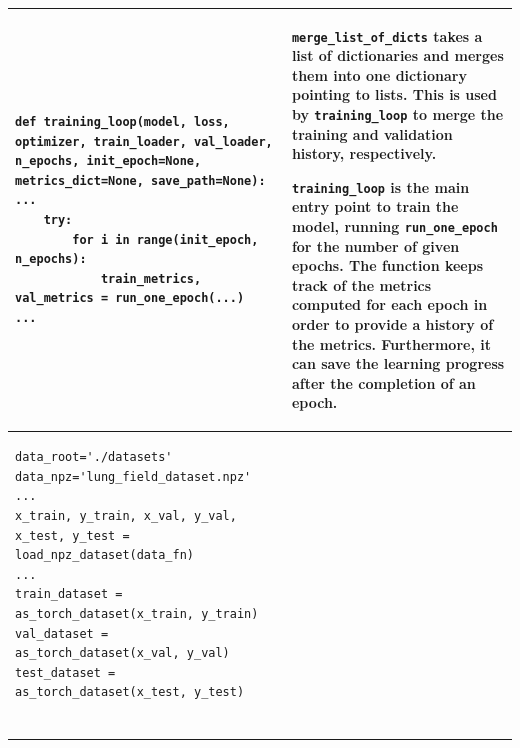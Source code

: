 \begin{longtable}{|m{}|m{}|}
\begin{lstlisting}
def training_loop(model, loss, optimizer, train_loader, val_loader, n_epochs, init_epoch=None, metrics_dict=None, save_path=None):
...
    try:
        for i in range(init_epoch, n_epochs):
            train_metrics, val_metrics = run_one_epoch(...)
...
\end{lstlisting} & \lstinline|merge_list_of_dicts| takes a list of dictionaries and merges them into one dictionary pointing to lists. This is used by \lstinline|training_loop| to merge the training and validation history, respectively. \vspace{8px}

\lstinline|training_loop| is the main entry point to train the model, running \lstinline|run_one_epoch| for the number of given epochs. The function keeps track of the metrics computed for each epoch in order to provide a history of the metrics. Furthermore, it can save the learning progress after the completion of an epoch. 
\\ \hline 
\begin{lstlisting}
data_root='./datasets'
data_npz='lung_field_dataset.npz'
...
x_train, y_train, x_val, y_val, x_test, y_test = load_npz_dataset(data_fn)
...
train_dataset = as_torch_dataset(x_train, y_train)
val_dataset = as_torch_dataset(x_val, y_val)
test_dataset = as_torch_dataset(x_test, y_test)


\end{lstlisting}
\end{longtable}
